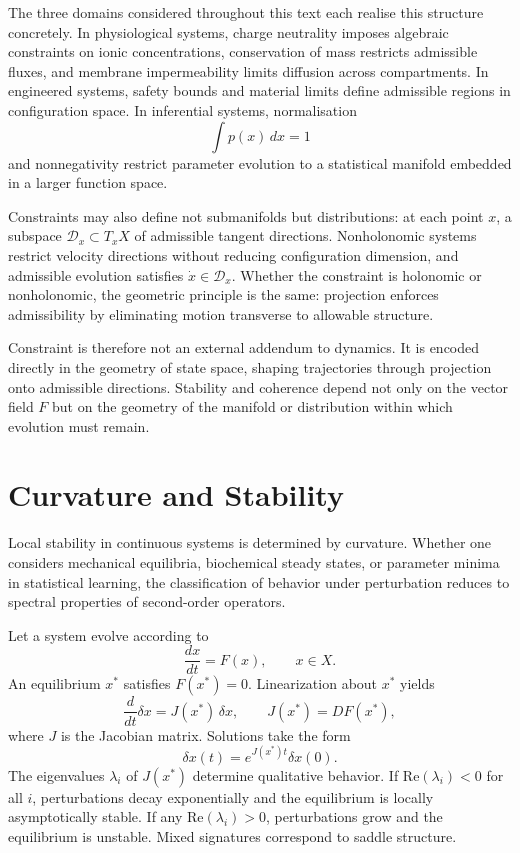 \documentclass[12pt]{book}
\begin{document}
The three domains considered throughout this text each realise this structure
concretely. In physiological systems, charge neutrality imposes algebraic
constraints on ionic concentrations, conservation of mass restricts admissible
fluxes, and membrane impermeability limits diffusion across compartments. In
engineered systems, safety bounds and material limits define admissible regions
in configuration space. In inferential systems, normalisation
\[
  \int p(x)\, dx = 1
\]
and nonnegativity restrict parameter evolution to a statistical manifold
embedded in a larger function space.

Constraints may also define not submanifolds but distributions: at each point
$x$, a subspace $\mathcal{D}_x \subset T_x X$ of admissible tangent directions.
Nonholonomic systems restrict velocity directions without reducing configuration
dimension, and admissible evolution satisfies $\dot{x} \in \mathcal{D}_x$.
Whether the constraint is holonomic or nonholonomic, the geometric principle is
the same: projection enforces admissibility by eliminating motion transverse to
allowable structure.

Constraint is therefore not an external addendum to dynamics. It is encoded
directly in the geometry of state space, shaping trajectories through
projection onto admissible directions. Stability and coherence depend not only
on the vector field $F$ but on the geometry of the manifold or distribution
within which evolution must remain.

\section{Curvature and Stability}

Local stability in continuous systems is determined by curvature. Whether one considers mechanical equilibria, biochemical steady states, or parameter minima in statistical learning, the classification of behavior under perturbation reduces to spectral properties of second-order operators.

Let a system evolve according to
\[
\frac{dx}{dt} = F(x),
\qquad x \in X.
\]
An equilibrium $x^*$ satisfies $F(x^*) = 0$. Linearization about $x^*$ yields
\[
\frac{d}{dt} \delta x
=
J(x^*) \, \delta x,
\qquad
J(x^*) = DF(x^*),
\]
where $J$ is the Jacobian matrix. Solutions take the form
\[
\delta x(t) = e^{J(x^*) t} \delta x(0).
\]
The eigenvalues $\lambda_i$ of $J(x^*)$ determine qualitative behavior. If $\mathrm{Re}(\lambda_i) < 0$ for all $i$, perturbations decay exponentially and the equilibrium is locally asymptotically stable. If any $\mathrm{Re}(\lambda_i) > 0$, perturbations grow and the equilibrium is unstable. Mixed signatures correspond to saddle structure.
\end{document}
